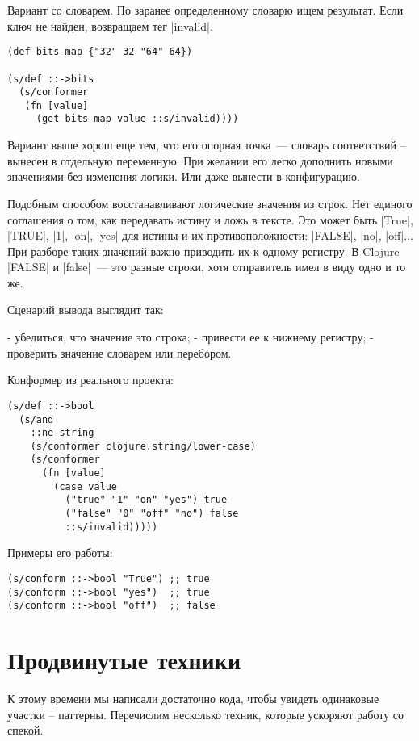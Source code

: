 Вариант со словарем. По заранее определенному словарю ищем результат. Если ключ
не найден, возвращаем тег \spverb|invalid|.

\begin{verbatim}
(def bits-map {"32" 32 "64" 64})

(s/def ::->bits
  (s/conformer
   (fn [value]
     (get bits-map value ::s/invalid))))
\end{verbatim}

Вариант выше хорош еще тем, что его опорная точка~--- словарь соответствий –
вынесен в отдельную переменную. При желании его легко дополнить новыми
значениями без изменения логики. Или даже вынести в конфигурацию.

Подобным способом восстанавливают логические значения из строк. Нет единого
соглашения о том, как передавать истину и ложь в тексте. Это может быть
\spverb|True|, \spverb|TRUE|, \spverb|1|, \spverb|on|, \spverb|yes| для истины и их противоположности:
\spverb|FALSE|, \spverb|no|, \spverb|off|... При разборе таких значений важно приводить их к
одному регистру. В Clojure \spverb|FALSE| и \spverb|false|~--- это разные строки, хотя
отправитель имел в виду одно и то же.

Сценарий вывода выглядит так:

- убедиться, что значение это строка;
- привести ее к нижнему регистру;
- проверить значение словарем или перебором.

Конформер из реального проекта:

\begin{verbatim}
(s/def ::->bool
  (s/and
    ::ne-string
    (s/conformer clojure.string/lower-case)
    (s/conformer
      (fn [value]
        (case value
          ("true" "1" "on" "yes") true
          ("false" "0" "off" "no") false
          ::s/invalid)))))
\end{verbatim}

Примеры его работы:

\begin{verbatim}
(s/conform ::->bool "True") ;; true
(s/conform ::->bool "yes")  ;; true
(s/conform ::->bool "off")  ;; false
\end{verbatim}

\section{Продвинутые техники}

К этому времени мы написали достаточно кода, чтобы увидеть одинаковые участки –
паттерны. Перечислим несколько техник, которые ускоряют работу со спекой.

